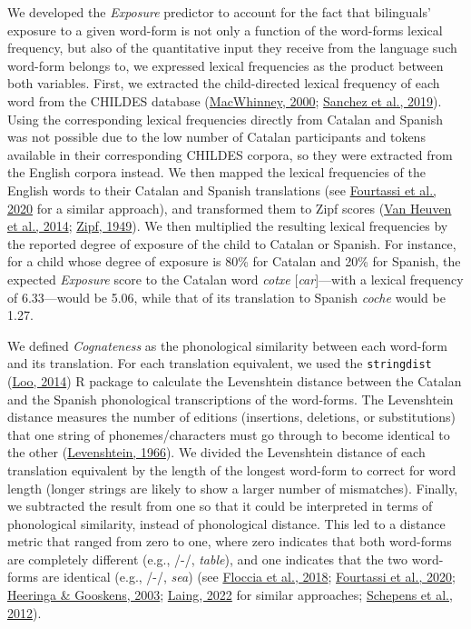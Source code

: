 \documentclass[
]{article}
\begin{document}
We developed the \emph{Exposure} predictor to account for the fact that
bilinguals' exposure to a given word-form is not only a function of the
word-forms lexical frequency, but also of the quantitative input they
receive from the language such word-form belongs to, we expressed
lexical frequencies as the product between both variables. First, we
extracted the child-directed lexical frequency of each word from the
CHILDES database
(\protect\hyperlink{ref-macwhinney2000childes}{MacWhinney, 2000};
\protect\hyperlink{ref-sanchez2019childesdb}{Sanchez et al., 2019}).
Using the corresponding lexical frequencies directly from Catalan and
Spanish was not possible due to the low number of Catalan participants
and tokens available in their corresponding CHILDES corpora, so they
were extracted from the English corpora instead. We then mapped the
lexical frequencies of the English words to their Catalan and Spanish
translations (see \protect\hyperlink{ref-fourtassi2020growth}{Fourtassi
et al., 2020} for a similar approach), and transformed them to Zipf
scores (\protect\hyperlink{ref-vanheuven2014subtlexuk}{Van Heuven et
al., 2014}; \protect\hyperlink{ref-zipf1949human}{Zipf, 1949}). We then
multiplied the resulting lexical frequencies by the reported degree of
exposure of the child to Catalan or Spanish. For instance, for a child
whose degree of exposure is 80\% for Catalan and 20\% for Spanish, the
expected \emph{Exposure} score to the Catalan word \emph{cotxe}
{[}\emph{car}{]}---with a lexical frequency of 6.33---would be 5.06,
while that of its translation to Spanish \emph{coche} would be 1.27.

We defined \emph{Cognateness} as the phonological similarity between
each word-form and its translation. For each translation equivalent, we
used the \texttt{stringdist}
(\protect\hyperlink{ref-vanderloo2014stringdist}{Loo, 2014}) R package
to calculate the Levenshtein distance between the Catalan and the
Spanish phonological transcriptions of the word-forms. The Levenshtein
distance measures the number of editions (insertions, deletions, or
substitutions) that one string of phonemes/characters must go through to
become identical to the other
(\protect\hyperlink{ref-levenshtein1966binary}{Levenshtein, 1966}). We
divided the Levenshtein distance of each translation equivalent by the
length of the longest word-form to correct for word length (longer
strings are likely to show a larger number of mismatches). Finally, we
subtracted the result from one so that it could be interpreted in terms
of phonological similarity, instead of phonological distance. This led
to a distance metric that ranged from zero to one, where zero indicates
that both word-forms are completely different (e.g.,
/-/, \emph{table}), and one indicates
that the two word-forms are identical (e.g.,
/-/, \emph{sea}) (see
\protect\hyperlink{ref-floccia2018introduction}{Floccia et al., 2018};
\protect\hyperlink{ref-fourtassi2020growth}{Fourtassi et al., 2020};
\protect\hyperlink{ref-heeringa2003norwegian}{Heeringa \& Gooskens,
2003}; \protect\hyperlink{ref-laing2022phonological}{Laing, 2022} for
similar approaches;
\protect\hyperlink{ref-schepens2012distributions}{Schepens et al.,
2012}).
\end{document}
